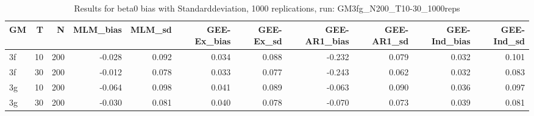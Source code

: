 \begin{table}[ht]
\centering
\begin{tabular}{lrrrrrrrrrr}
  \hline
GM & T & N & MLM\_bias & MLM\_sd & GEE-Ex\_bias & GEE-Ex\_sd & GEE-AR1\_bias & GEE-AR1\_sd & GEE-Ind\_bias & GEE-Ind\_sd \\ 
  \hline
3f & 10 & 200 & -0.028 & 0.092 & 0.034 & 0.088 & -0.232 & 0.079 & 0.032 & 0.101 \\ 
  3f & 30 & 200 & -0.012 & 0.078 & 0.033 & 0.077 & -0.243 & 0.062 & 0.032 & 0.083 \\ 
  3g & 10 & 200 & -0.064 & 0.098 & 0.041 & 0.089 & -0.063 & 0.090 & 0.036 & 0.097 \\ 
  3g & 30 & 200 & -0.030 & 0.081 & 0.040 & 0.078 & -0.070 & 0.073 & 0.039 & 0.081 \\ 
   \hline
\end{tabular}
\caption{Results for beta0 bias with Standarddeviation, 1000 replications, run: GM3fg_N200_T10-30_1000reps} 
\label{tab:beta0_bias_sd}
\end{table}
